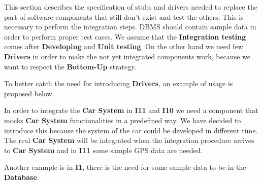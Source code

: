 This section describes the specification of stubs and drivers needed to replace the part of software components that still don't exist and test the others. This is necessary to perform the integration steps. DBMS should contain sample data in order to perform proper test cases. We assume that the \textbf{Integration testing} comes after \textbf{Developing} and \textbf{Unit testing}. %
On the other hand we need few \textbf{Drivers} in order to make the not yet integrated components work, because we want to respect the \textbf{Bottom-Up} strategy.\par
To better catch the need for introducing \textbf{Drivers}, an example of usage is proposed below.\par
In order to integrate the \textbf{Car System} in \textbf{I11} and \textbf{I10}  we need a component that mocks \textbf{Car System} functionalities in a predefined way. We have decided to introduce this because the system of the car could be developed in different time. The real \textbf{Car System} will be integrated when the integration procedure arrives to \textbf{Car System} and in \textbf{I11} some sample GPS data are needed.\par
 Another example is in \textbf{I1}, there is the need for some sample data to be in the \textbf{Database}.
